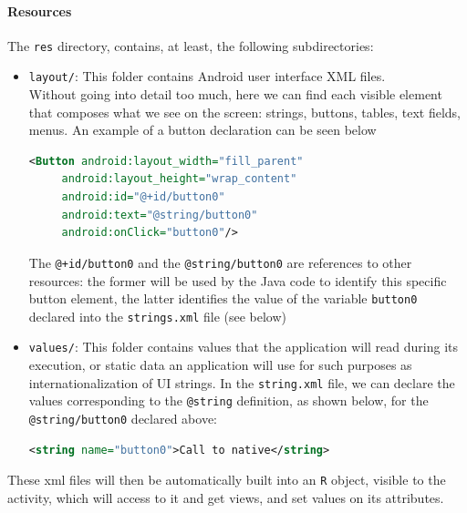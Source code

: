 \documentclass[a4paper,10pt]{article}
\newcommand{\keyword}[1]{\texttt{#1}}
\begin{document}
\begin{multicols}{2}
\paragraph{Resources}
The \keyword{res} directory, contains, at least, the following subdirectories:
\begin{itemize}
\item \keyword{layout/}: This folder contains Android user interface XML files.\\
Without going into detail too much, here we can find each visible element that composes what we see on the screen: strings, buttons, tables, text fields, menus. An example of a button declaration can be seen below
\begin{lstlisting}[language=XML,
				   columns=fullflexible,
				   showstringspaces=false,
				   commentstyle=\color{gray}\upshape]
<Button android:layout_width="fill_parent"
	 android:layout_height="wrap_content"
	 android:id="@+id/button0"
	 android:text="@string/button0"
	 android:onClick="button0"/>
\end{lstlisting}
The \keyword{@+id/button0} and the \keyword{@string/button0} are references to other resources: the former will be used by the Java code to identify this specific button element, the latter identifies the value of the variable \keyword{button0} declared into the \keyword{strings.xml} file (see below)
\item \keyword{values/}: This folder contains values that the application will read during its execution, or static data an application will use for such purposes as internationalization of UI strings. In the \keyword{string.xml} file, we can declare the values corresponding to the \keyword{@string} definition, as shown below, for the \keyword{@string/button0} declared above:
\begin{lstlisting}[language=XML,
				   columns=fullflexible,
				   showstringspaces=false,
				   commentstyle=\color{gray}\upshape]
<string name="button0">Call to native</string>
\end{lstlisting}
\end{itemize}
These xml files will then be automatically built into an \keyword{R} object, visible to the activity, which will access to it and get views, and set values on its attributes.



\end{multicols}
\end{document}
